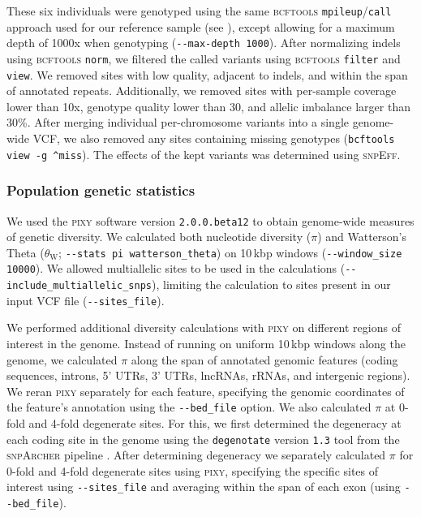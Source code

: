 These six individuals were genotyped using the same \textsc{bcftools}
\texttt{mpileup}/\texttt{call} approach used for our reference sample
(see ), except allowing for a maximum depth of 1000x when
genotyping (\texttt{-{}-max-depth 1000}).
After normalizing indels using \textsc{bcftools} \texttt{norm}, we filtered the called
variants using \textsc{bcftools} \texttt{filter} and \texttt{view}.
We removed sites with low quality, adjacent to indels, and within the span of annotated
repeats.
Additionally, we removed sites with per-sample coverage lower than 10x, genotype quality
lower than 30, and allelic imbalance larger than 30\%.
After merging individual per-chromosome variants into a single genome-wide VCF, we also
removed any sites containing missing genotypes (\texttt{bcftools view -g \^{}miss}).
The effects of the kept variants was determined using \textsc{snpEff}.

\subsubsection*{Population genetic statistics}

We used the \textsc{pixy} software version \texttt{2.0.0.beta12}
\citep{korunes_pixy_2021,bailey_pixy2_2025} to obtain genome-wide measures of genetic
diversity. We calculated both nucleotide diversity ($\pi$) and Watterson's Theta
($\theta_\text{W}$; \texttt{-{}-stats pi watterson\_theta}) on 10\,kbp windows
(\texttt{-{}-window\_size 10000}).
We allowed multiallelic sites to be used in the calculations
(\texttt{-{}-include\_multiallelic\_snps}), limiting the calculation to sites present in our
input VCF file (\texttt{-{}-sites\_file}).
\vspace{0.1cm}

We performed additional diversity calculations with \textsc{pixy} on different regions
of interest in the genome.
Instead of running on uniform 10\,kbp windows along the genome, we calculated $\pi$ along the
span of annotated genomic features (coding sequences, introns, 5' UTRs, 3' UTRs, lncRNAs,
rRNAs, and intergenic regions).
We reran \textsc{pixy} separately for each feature, specifying the genomic coordinates of
the feature's annotation using the \texttt{-{}-bed\_file} option.
We also calculated $\pi$ at 0-fold and 4-fold degenerate sites.
For this, we first determined the degeneracy at each coding site in the genome using the
\texttt{degenotate} version \texttt{1.3} tool from the \textsc{snpArcher} pipeline
\citep{mirchandani_snparcher_2023}.
After determining degeneracy we separately calculated $\pi$ for 0-fold and 4-fold
degenerate sites using \textsc{pixy}, specifying the specific sites of interest using
\texttt{-{}-sites\_file} and averaging within the span of each exon (using \texttt{-{}-bed\_file}).

